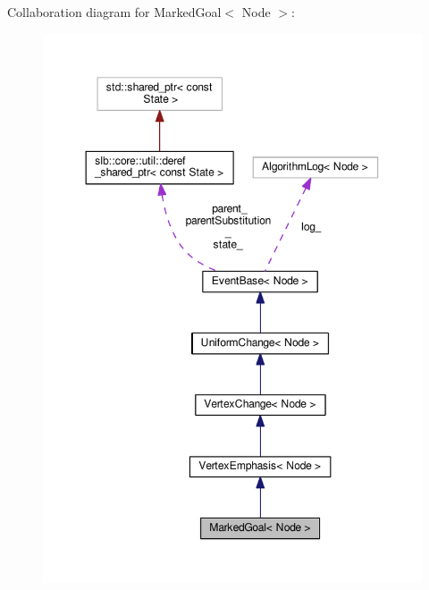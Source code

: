 Collaboration diagram for Marked\+Goal$<$ Node $>$\+:\nopagebreak
\begin{figure}[H]
\begin{center}
\leavevmode
\includegraphics[width=350pt]{structMarkedGoal__coll__graph}
\end{center}
\end{figure}
